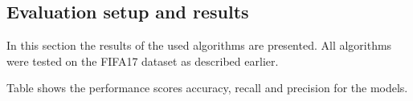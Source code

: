 \subsection{Evaluation setup and results}
\label{sec:Evaluation}
In this section the results of the used algorithms are presented. All algorithms were tested on the FIFA17 dataset as described earlier. 

Table shows the performance scores accuracy, recall and precision for the models. 